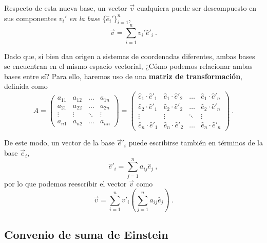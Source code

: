 Respecto de esta nueva base, un vector $\vec{v}$ cualquiera puede ser descompuesto en sus componentes $v_i'$ \emph{en la base} $\{ \hat{e}_i'\}_{i=1}^n$,
\begin{equation}
    \vec{v} = \sum_{i=1}^n v_i' \hat{e}'_i \ .
\end{equation}

Dado que, si bien dan origen a sistemas de coordenadas diferentes, ambas bases se encuentran en el mismo espacio vectorial, ¿Cómo podemos relacionar ambas bases entre sí? Para ello, haremos uso de una \textbf{matriz de transformación}, definida como
\begin{equation}
    A = \begin{pmatrix}
        a_{11} & a_{12} & \dots & a_{1n} \\
        a_{21} & a_{22} & \dots & a_{2n} \\
        \vdots & \vdots & \ddots & \vdots \\
        a_{n1} & a_{n2} & \dots & a_{nn}
    \end{pmatrix} =
    \begin{pmatrix}
        \hat{e}_1 \cdot \hat{e}'_1 & \hat{e}_1 \cdot \hat{e}'_2 & \dots & \hat{e}_1 \cdot \hat{e}'_n \\
        \hat{e}_2 \cdot \hat{e}'_1 & \hat{e}_2 \cdot \hat{e}'_2 & \dots & \hat{e}_2 \cdot \hat{e}'_n \\
        \vdots & \vdots & \ddots & \vdots \\
        \hat{e}_n \cdot \hat{e}'_1 & \hat{e}_n \cdot \hat{e}'_2 & \dots & \hat{e}_n \cdot \hat{e}'_n
    \end{pmatrix} \ .
\end{equation}

De este modo, un vector de la base $\vec{e}'_i$ puede escribirse también en términos de la base $\vec{e}_i$,
\begin{equation} \label{eq:transformacion-coordenadas}
    \hat{e}'_i = \sum_{j=1}^n a_{ij} \hat{e}_j \ ,
\end{equation}
por lo que podemos reescribir el vector $\vec{v}$ como
\begin{equation} \label{eq:transformacion-vector}
    \vec{v} = \sum_{i=1}^n v'_i \left( \sum_{j=1}^n a_{ij} \hat{e}_j \right) \ .
\end{equation}

\subsection{Convenio de suma de Einstein}


